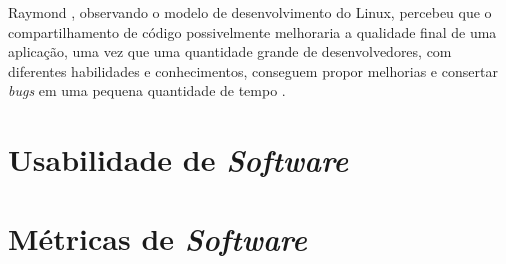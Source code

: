Raymond \cite{raymond1999}, observando o modelo de desenvolvimento do Linux, percebeu que o compartilhamento de código possivelmente melhoraria a qualidade final de uma aplicação, uma vez que uma quantidade grande de desenvolvedores, com diferentes habilidades e conhecimentos, conseguem propor melhorias e consertar \textit{bugs} em uma pequena quantidade de tempo \cite{meirelles2013}.

\section{Usabilidade de \textit{Software}}

\section{Métricas de \textit{Software}}
